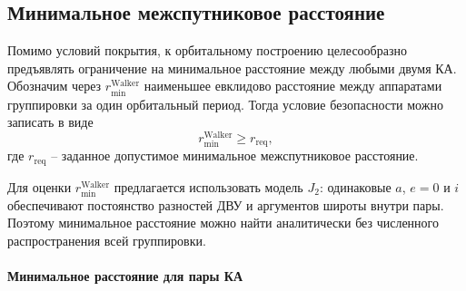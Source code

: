 \subsection{Минимальное межспутниковое расстояние}
\label{subsec:minimum_distance}

Помимо условий покрытия, к орбитальному построению целесообразно предъявлять ограничение на минимальное расстояние между любыми двумя КА. Обозначим через $r_{\min}^{\mathrm{Walker}}$ наименьшее евклидово расстояние между аппаратами группировки за один орбитальный период. Тогда условие безопасности можно записать в виде
\begin{equation}
    r_{\min}^{\mathrm{Walker}} \geq r_{\mathrm{req}},
\end{equation}
где $r_{\mathrm{req}}$ -- заданное допустимое минимальное межспутниковое
расстояние.

Для оценки $r_{\min}^{\mathrm{Walker}}$ предлагается использовать модель $J_2$: одинаковые $a$, $e=0$ и $i$ обеспечивают постоянство разностей ДВУ и аргументов широты внутри пары. Поэтому минимальное расстояние можно найти аналитически без численного распространения всей группировки.

\paragraph{Минимальное расстояние для пары КА}

